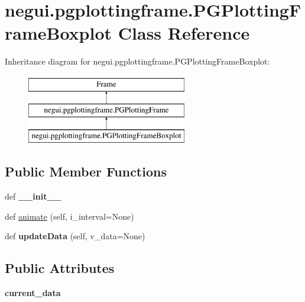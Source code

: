 \hypertarget{classnegui_1_1pgplottingframe_1_1PGPlottingFrameBoxplot}{}\section{negui.\+pgplottingframe.\+P\+G\+Plotting\+Frame\+Boxplot Class Reference}
\label{classnegui_1_1pgplottingframe_1_1PGPlottingFrameBoxplot}
Inheritance diagram for negui.\+pgplottingframe.\+P\+G\+Plotting\+Frame\+Boxplot\+:\begin{figure}[H]
\begin{center}
\leavevmode
\includegraphics[height=3.000000cm]{classnegui_1_1pgplottingframe_1_1PGPlottingFrameBoxplot}
\end{center}
\end{figure}
\subsection*{Public Member Functions}
\begin{DoxyCompactItemize}
\item 
def {\bfseries \+\_\+\+\_\+init\+\_\+\+\_\+}\hypertarget{classnegui_1_1pgplottingframe_1_1PGPlottingFrameBoxplot_a5ed5a0e24257562e1530fd9f23153939}{}\label{classnegui_1_1pgplottingframe_1_1PGPlottingFrameBoxplot_a5ed5a0e24257562e1530fd9f23153939}

\item 
def \hyperlink{classnegui_1_1pgplottingframe_1_1PGPlottingFrameBoxplot_a329de4586c320b5273c8d21231e55bee}{animate} (self, i\+\_\+interval=None)
\item 
def {\bfseries update\+Data} (self, v\+\_\+data=None)\hypertarget{classnegui_1_1pgplottingframe_1_1PGPlottingFrameBoxplot_a196020a549aaa8bff0725dba7eea2356}{}\label{classnegui_1_1pgplottingframe_1_1PGPlottingFrameBoxplot_a196020a549aaa8bff0725dba7eea2356}

\end{DoxyCompactItemize}
\subsection*{Public Attributes}
\begin{DoxyCompactItemize}
\item 
{\bfseries current\+\_\+data}\hypertarget{classnegui_1_1pgplottingframe_1_1PGPlottingFrameBoxplot_abf223287d5d03d24a1bba0d0b677be09}{}\label{classnegui_1_1pgplottingframe_1_1PGPlottingFrameBoxplot_abf223287d5d03d24a1bba0d0b677be09}

\end{DoxyCompactItemize}



